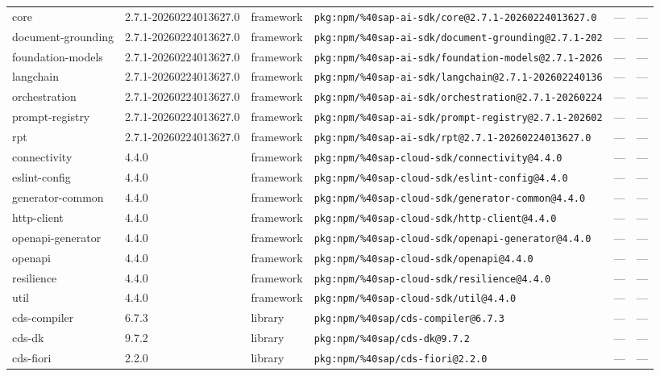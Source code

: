 \documentclass[11pt]{article}
\begin{document}
\begin{longtable}{|l|l|l|p{2.2cm}|l|p{4cm}|}
core & 2.7.1-20260224013627.0 & framework & \texttt{pkg:npm/\%40sap-ai-sdk/core@2.7.1-20260224013627.0} & — & — \\
document-grounding & 2.7.1-20260224013627.0 & framework & \texttt{pkg:npm/\%40sap-ai-sdk/document-grounding@2.7.1-202} & — & — \\
foundation-models & 2.7.1-20260224013627.0 & framework & \texttt{pkg:npm/\%40sap-ai-sdk/foundation-models@2.7.1-2026} & — & — \\
langchain & 2.7.1-20260224013627.0 & framework & \texttt{pkg:npm/\%40sap-ai-sdk/langchain@2.7.1-202602240136} & — & — \\
orchestration & 2.7.1-20260224013627.0 & framework & \texttt{pkg:npm/\%40sap-ai-sdk/orchestration@2.7.1-20260224} & — & — \\
prompt-registry & 2.7.1-20260224013627.0 & framework & \texttt{pkg:npm/\%40sap-ai-sdk/prompt-registry@2.7.1-202602} & — & — \\
rpt & 2.7.1-20260224013627.0 & framework & \texttt{pkg:npm/\%40sap-ai-sdk/rpt@2.7.1-20260224013627.0} & — & — \\
connectivity & 4.4.0 & framework & \texttt{pkg:npm/\%40sap-cloud-sdk/connectivity@4.4.0} & — & — \\
eslint-config & 4.4.0 & framework & \texttt{pkg:npm/\%40sap-cloud-sdk/eslint-config@4.4.0} & — & — \\
generator-common & 4.4.0 & framework & \texttt{pkg:npm/\%40sap-cloud-sdk/generator-common@4.4.0} & — & — \\
http-client & 4.4.0 & framework & \texttt{pkg:npm/\%40sap-cloud-sdk/http-client@4.4.0} & — & — \\
openapi-generator & 4.4.0 & framework & \texttt{pkg:npm/\%40sap-cloud-sdk/openapi-generator@4.4.0} & — & — \\
openapi & 4.4.0 & framework & \texttt{pkg:npm/\%40sap-cloud-sdk/openapi@4.4.0} & — & — \\
resilience & 4.4.0 & framework & \texttt{pkg:npm/\%40sap-cloud-sdk/resilience@4.4.0} & — & — \\
util & 4.4.0 & framework & \texttt{pkg:npm/\%40sap-cloud-sdk/util@4.4.0} & — & — \\
cds-compiler & 6.7.3 & library & \texttt{pkg:npm/\%40sap/cds-compiler@6.7.3} & — & — \\
cds-dk & 9.7.2 & library & \texttt{pkg:npm/\%40sap/cds-dk@9.7.2} & — & — \\
cds-fiori & 2.2.0 & library & \texttt{pkg:npm/\%40sap/cds-fiori@2.2.0} & — & — \\

\end{longtable}
\end{document}
